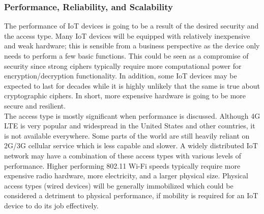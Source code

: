 \subsubsection{Performance, Reliability, and Scalability}
The performance of IoT devices is going to be a result of the desired security
and the access type. Many IoT devices will be equipped with relatively
inexpensive and weak hardware; this is sensible from a business perspective as
the device only needs to perform a few basic functions. This could be seen as
a compromise of security since strong ciphers typically require more
computational power for encryption/decryption functionality. In addition, some
IoT devices may be expected to last for decades while it is highly unlikely
that the same is true about cryptographic ciphers. In short, more expensive
hardware is going to be more secure and resilient. \\

The access type is mostly significant when performance is discussed. Although
4G LTE is very popular and widespread in the United States and other
countries, it is not available everywhere. Some parts of the world are still
heavily reliant on 2G/3G cellular service which is less capable and slower. A
widely distributed IoT network may have a combination of these access types
with various levels of performance. Higher performing 802.11 Wi-Fi speeds
typically require more expensive radio hardware, more electricity, and a
larger physical size. Physical access types (wired devices) will be generally
immobilized which could be considered a detriment to physical performance, if
mobility is required for an IoT device to do its job effectively.
